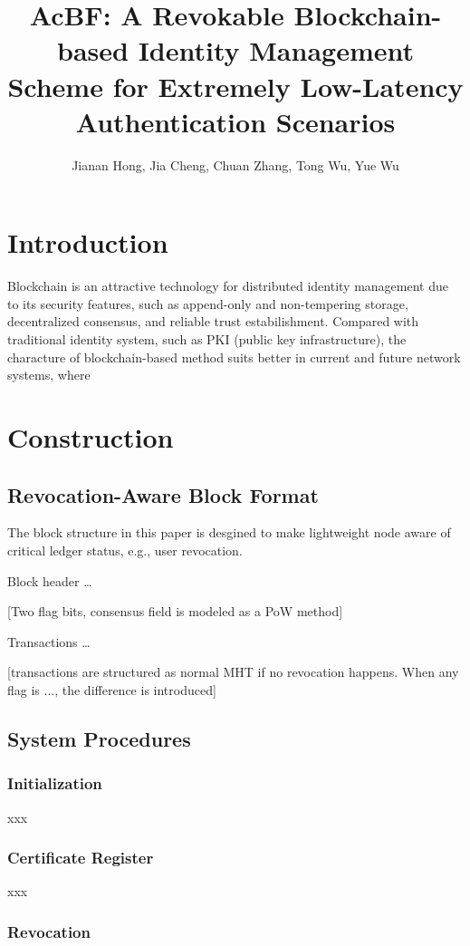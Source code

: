 \documentclass{IEEEconf}
\title{AcBF: A Revokable Blockchain-based Identity Management Scheme for Extremely Low-Latency Authentication Scenarios}
\author{Jianan Hong, Jia Cheng, Chuan Zhang, Tong Wu, Yue Wu}
\begin{document}
\maketitle

\section{Introduction}
Blockchain is an attractive technology for distributed identity management due to its security features, such as append-only and non-tempering storage, decentralized consensus, and reliable trust estabilishment. Compared with traditional identity system, such as PKI (public key infrastructure), the characture of blockchain-based method suits better in current and future network systems, where

\section{Construction}
\subsection{Revocation-Aware Block Format}
The block structure in this paper is desgined to make lightweight node aware of critical ledger status, e.g., user revocation. 

Block header \dots

[Two flag bits, consensus field is modeled as a PoW method]

Transactions \dots

[transactions are structured as normal MHT if no revocation happens. When any flag is ..., the difference is introduced]


\subsection{System Procedures}
\subsubsection{Initialization}
xxx

\subsubsection{Certificate Register}
xxx



\subsubsection{Revocation}
\end{document}
